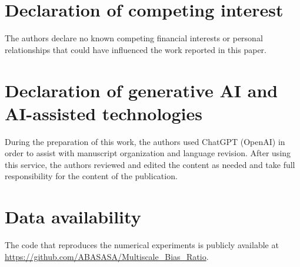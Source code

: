 \documentclass[12pt]{article}
\begin{document}
\section*{Declaration of competing interest}
The authors declare no known competing financial interests or personal relationships that could have influenced the work reported in this paper.

\section*{Declaration of generative AI and AI-assisted technologies}
During the preparation of this work, the authors used ChatGPT (OpenAI) in order to assist with manuscript organization and language revision. After using this service, the authors reviewed and edited the content as needed and take full responsibility for the content of the publication.

\section*{Data availability}
The code that reproduces the numerical experiments is publicly available at \url{https://github.com/ABASASA/Multiscale_Bias_Ratio}.

 

\end{document}
